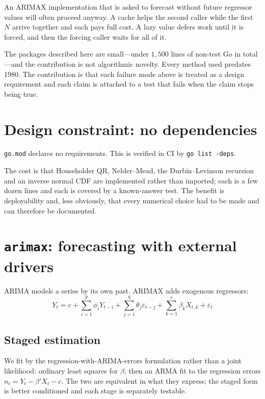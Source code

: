 \documentclass[10pt,twocolumn]{article}
\begin{document}
An ARIMAX implementation that is asked to forecast without future regressor
values will often proceed anyway. A cache helps the second caller while the
first $N$ arrive together and each pays full cost. A lazy value defers work
until it is forced, and then the forcing caller waits for all of it.

The packages described here are small---under $1{,}500$ lines of
non-test Go in total---and the contribution is not algorithmic novelty. Every
method used predates 1980. The contribution is that each failure mode above is
treated as a design requirement and each claim is attached to a test that fails
when the claim stops being true.

\section{Design constraint: no dependencies}

\texttt{go.mod} declares no requirements. This is verified in CI by
\texttt{go list -deps}.

The cost is that Householder QR, Nelder--Mead, the Durbin--Levinson recursion
and an inverse normal CDF are implemented rather than imported; each is a few
dozen lines and each is covered by a known-answer test. The benefit is
deployability and, less obviously, that every numerical choice had to be made and
can therefore be documented.

\section{\texttt{arimax}: forecasting with external drivers}

ARIMA models a series by its own past. ARIMAX adds exogenous regressors:
\begin{equation}
Y_t = c + \sum_{i=1}^{p}\phi_i Y_{t-i} + \sum_{j=1}^{q}\theta_j \varepsilon_{t-j}
      + \sum_{k=1}^{r}\beta_k X_{t,k} + \varepsilon_t
\end{equation}

\subsection{Staged estimation}

We fit by the regression-with-ARIMA-errors formulation rather than a joint
likelihood: ordinary least squares for $\beta$, then an ARMA fit to the
regression errors $n_t = Y_t - \beta'X_t - c$. The two are equivalent in what they
express; the staged form is better conditioned and each stage is separately
testable.
\end{document}
